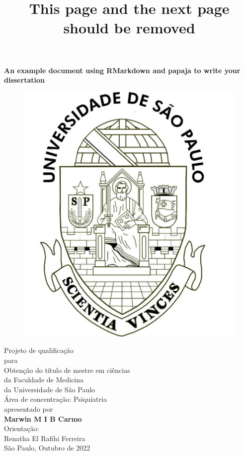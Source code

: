 \documentclass[
  ,doc,11pt, twoside,floatsintext]{apa6}
\title{This page and the next page should be removed}
\author{\textsuperscript{}}
\date{}
\affiliation{\vspace{0.5cm}\textsuperscript{} }
\begin{document}
\maketitle

\clearpage

\mbox{}\thispagestyle{empty}\clearpage

\setcounter{page}{1}

\thispagestyle{empty}
\begin{center}
\vspace*{10mm}
\textbf{\Large An example document using RMarkdown and papaja to write your dissertation}\\

\begin{figure}[h]
\begin{center}
\includegraphics[width=!,totalheight=!,scale=0.18]{usp-brazao.jpg}
\end{center}
\end{figure}
{ 
Projeto de qualificação\\
para\\ 
Obtenção do título de mestre em ciências\\
da Faculdade de Medicina\\
da Universidade de São Paulo  \\
Área de concentração: Psiquiatria  \\
apresentado por  \\ 
\smallskip
\textbf{Marwin M I B Carmo}\\
\smallskip
Orientação:  \\
Renatha El Rafihi Ferreira  \\
\smallskip
São Paulo, Outubro de 2022\\
}
\end{center}
\end{document}
